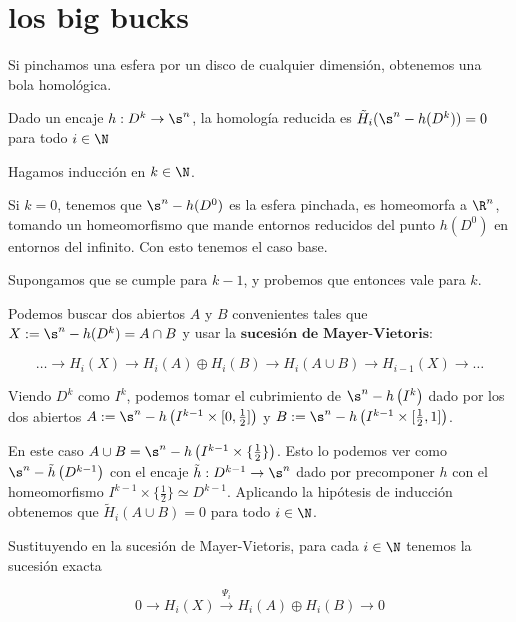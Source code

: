 \section{los big bucks}

Si pinchamos una esfera por un disco de cualquier dimensión, obtenemos una bola homológica.

\begin{teo}
    Dado un encaje $h:D^k\to \s^n$, la homología reducida es $\tilde{H}_i(\s^n - h(D^k))=0$ para todo $i\in\N$
\end{teo}


\begin{dem}
    Hagamos inducción en $k\in\N$. 
    
    Si $k=0$, tenemos que $\s^n - h(D^0)$ es la esfera pinchada, es homeomorfa a $\R^n$, tomando un homeomorfismo que mande entornos reducidos del punto $h(D^0)$ en entornos del infinito. Con esto tenemos el caso base.

    Supongamos que se cumple para $k-1$, y probemos que entonces vale para $k$.

    Podemos buscar dos abiertos $A$ y $B$ convenientes tales que $X := \s^n-h(D^k) = A\cap B$ y usar la $\textbf{sucesión de}$ $\textbf{Mayer-Vietoris}$:
    
    $$\dots\rightarrow H_i(X)\rightarrow H_i(A)\oplus H_i(B)\rightarrow H_i(A\cup B)\rightarrow H_{i-1}(X)\rightarrow\dots$$
    
    Viendo $D^k$ como $I^k$, podemos tomar el cubrimiento de $\s^n-h\left(I^k\right)$ dado por los dos abiertos $A:=\s^n - h\left(I^{k-1}\times[0,\frac{1}{2}]\right)$ y $B:=\s^n - h\left(I^{k-1}\times[\frac{1}{2},1]\right)$.


    En este caso $A\cup B = \s^n-h\left(I^{k-1}\times\{\frac{1}{2}\}\right)$. Esto lo podemos ver como $\s^n-\tilde{h}\left(D^{k-1}\right)$ con el encaje $\tilde{h}:D^{k-1}\to\s^n$ dado por precomponer $h$ con el homeomorfismo $I^{k-1}\times\{\frac{1}{2}\}\simeq D^{k-1}$. Aplicando la hipótesis de inducción obtenemos que $\tilde{H}_i(A\cup B)=0$ para todo $i\in\N$.

    Sustituyendo en la sucesión de Mayer-Vietoris, para cada $i\in\N$ tenemos la sucesión exacta

    $$0\rightarrow H_i(X)\xrightarrow{\Psi_i} H_i(A)\oplus H_i(B)\rightarrow 0$$


\end{dem}
